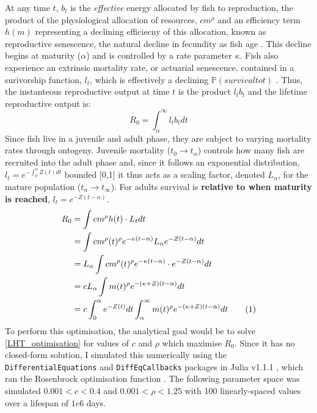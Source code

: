 \documentclass[a4paper]{article} %
\newcommand\numberthis{\addtocounter{equation}{1}\tag{\theequation}}
\begin{document}
At any time $t$, $b_{t}$ is the \textit{effective} energy allocated by fish to reproduction, the product of the physiological allocation of resources, $cm^{\rho}$ and an efficiency term $h(m)$ representing a declining efficiecny of this allocation, known as reproductive senescence, the natural decline in fecundity as fish age \autocite{Stearns2000, Benoit2018, Vrtilek2018}. This decline begins at maturity ($\alpha$) and is controlled by a rate parameter $\kappa$. Fish also experience an extrinsic mortality rate, or actuarial senescence, contained in a surivorship function, $l_t$, which is effectively a declining $\mathbb{P}(survival to t)$ \autocite{Charnov1993, Charnov2001, Benoit2018, Laird2010, Reznick2002, Reznick2006}. Thus, the instanteous reproductive output at time $t$ is the product $l_{t}b_{t}$ and the lifetime reproductive output is:
\begin{equation}
    R_{0} = \int_{\alpha}^{\infty}l_{t}b_{t} dt
\end{equation}
Since fish live in a juvenile and adult phase, they are subject to varying mortality rates through ontogeny. Juvenile mortality ($t_0 \rightarrow t_{\alpha}$) controls how many fish are recruited into the adult phase and, since it follows an exponential distribution, $l_t = e^{-\int_{0}^{\alpha}Z(t)dt}$ bounded [0,1] it thus acts as a scaling factor, denoted $L_{\alpha}$, for the mature population ($t_{\alpha} \rightarrow t_{\infty}$). For adults survival is \textbf{relative to when maturity is reached}, $l_{t} = e^{-Z(t-\alpha)}$.
\begin{align*}
    R_{0} &= \int cm^{\rho}h(t) \cdot L_{t} dt \\
          &= \int cm^{\rho}(t)^{\rho} e^{-\kappa(t-\alpha)} L_{\alpha}e^{-Z(t-\alpha)} dt \\
          &= L_{\alpha}\int cm^{\rho}(t)^{\rho} e^{-\kappa(t-\alpha)} \cdot e^{-Z(t-\alpha)} dt \\
          &= cL_{\alpha}\int m(t)^{\rho} e^{-(\kappa+Z)(t-\alpha)} dt \\
          &= c\int_{0}^{\alpha}e^{-Z(t)}dt\int_{\alpha}^{\infty} m(t)^{\rho} e^{-(\kappa+Z)(t-\alpha)} dt \numberthis \label{LHT_optimisation}
\end{align*}
To perform this optimisation, the analytical goal would be to solve \eqref{LHT_optimisation} for values of $c$ and $\rho$ which maximise $R_0$. Since it has no closed-form solution, I simulated this numerically using the \texttt{DifferentialEquations} and \texttt{DiffEqCallbacks} packages in Julia v1.1.1 \autocite{Bezanson2017}, which ran the Rosenbrock optimisation function \autocite{Rosenbrock1960}. The following parameter space was simulated $0.001 < c < 0.4$ and $0.001 < \rho < 1.25$ with 100 linearly-spaced values over a lifespan of $1e6$ days.
\end{document}
